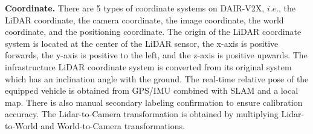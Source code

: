 \noindent \textbf{Coordinate.}
There are 5 types of coordinate systems on DAIR-V2X, $i.e.$, the LiDAR coordinate, the camera coordinate, the image coordinate, the world coordinate, and the positioning coordinate. 
The origin of the LiDAR coordinate system is located at the center of the LiDAR sensor, the x-axis is positive forwards, the y-axis is positive to the left, and the z-axis is positive upwards.
The infrastructure LiDAR coordinate system is converted from its original system which has an inclination angle with the ground. 
The real-time relative pose of the equipped vehicle is obtained from GPS/IMU combined with SLAM and a local map. There is also manual secondary labeling confirmation to ensure calibration accuracy.
The Lidar-to-Camera transformation is obtained by multiplying Lidar-to-World and World-to-Camera transformations.



